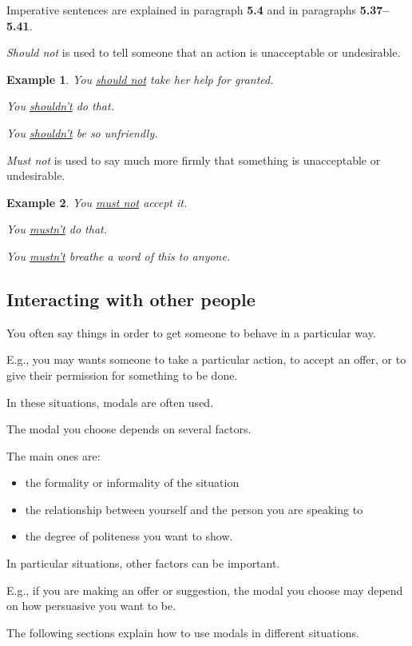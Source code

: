 \documentclass[oneside]{book}
\numberwithin{equation}{section}
\newtheorem{example}{Example}[section]
\begin{document}
Imperative sentences are explained in paragraph \textbf{5.4} and in paragraphs \textbf{5.37--5.41}.

%
\noindent{} \textit{Should not} is used to tell someone that an action is unacceptable or undesirable.
\begin{example}
    You \underline{should not} take her help for granted.
    
    You \underline{shouldn't} do that.
    
    You \underline{shouldn't} be so unfriendly.
\end{example}
%
\noindent{} \textit{Must not} is used to say much more firmly that something is unacceptable or undesirable.
\begin{example}
    You \underline{must not} accept it.
    
    You \underline{mustn't} do that.
    
    You \underline{mustn't} breathe a word of this to anyone.
\end{example}

\subsection{Interacting with other people}
\noindent{} You often say things in order to get someone to behave in a particular way.

E.g., you may wants someone to take a particular action, to accept an offer, or to give their permission for something to be done.

%
In these situations, modals are often used.

The modal you choose depends on several factors.

The main ones are:
\begin{itemize}
    \item the formality or informality of the situation
    \item the relationship between yourself and the person you are speaking to
    \item the degree of politeness you want to show.
\end{itemize}
In particular situations, other factors can be important.

E.g., if you are making an offer or suggestion, the modal you choose may depend on how persuasive you want to be.

%
\noindent{} The following sections explain how to use modals in different situations.
\end{document}
